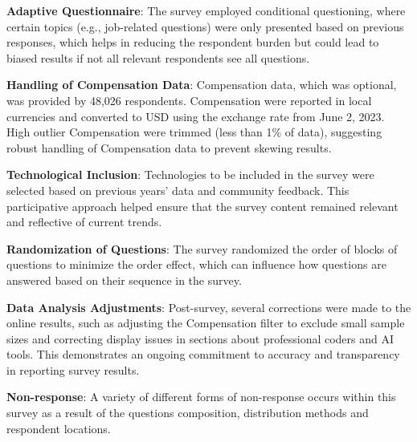 \documentclass[
  12pt,
]{article}
\begin{document}
\textbf{Adaptive Questionnaire}: The survey employed conditional
questioning, where certain topics (e.g., job-related questions) were
only presented based on previous responses, which helps in reducing the
respondent burden but could lead to biased results if not all relevant
respondents see all questions.

\textbf{Handling of Compensation Data}: Compensation data, which was
optional, was provided by 48,026 respondents. Compensation were reported
in local currencies and converted to USD using the exchange rate from
June 2, 2023. High outlier Compensation were trimmed (less than 1\% of
data), suggesting robust handling of Compensation data to prevent
skewing results.

\textbf{Technological Inclusion}: Technologies to be included in the
survey were selected based on previous years' data and community
feedback. This participative approach helped ensure that the survey
content remained relevant and reflective of current trends.

\textbf{Randomization of Questions}: The survey randomized the order of
blocks of questions to minimize the order effect, which can influence
how questions are answered based on their sequence in the survey.

\textbf{Data Analysis Adjustments}: Post-survey, several corrections
were made to the online results, such as adjusting the Compensation
filter to exclude small sample sizes and correcting display issues in
sections about professional coders and AI tools. This demonstrates an
ongoing commitment to accuracy and transparency in reporting survey
results.

\textbf{Non-response}: A variety of different forms of non-response
occurs within this survey as a result of the questions composition,
distribution methods and respondent locations.
\end{document}
